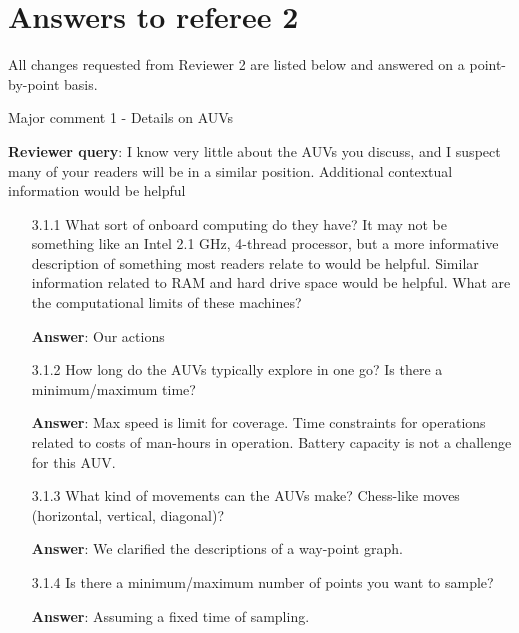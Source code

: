 \documentclass[a4paper]{article}
\newcounter{reviewer}
\def\reply{\textbf{Reviewer query}}
\def\action{\textbf{Answer}}
\begin{document}

\section*{Answers to referee 2}
All changes requested from Reviewer 2 are listed below and answered on a point-by-point basis.

\setcounter{reviewer}{3}

\begin{answers}
\item{Major comment 1 - Details on AUVs}\label{r2c1}

\reply: I know very little about the AUVs you discuss, and I suspect many of your readers will be in a similar position. Additional contextual information would be helpful

\begin{itemize}[noitemsep,topsep=0pt,parsep=0pt,partopsep=0pt]

\item[3.1.1] What sort of onboard computing do they have? It may not be something like an Intel 2.1 GHz, 4-thread processor, but a more informative description of something most readers relate to would be helpful. Similar information related to RAM and hard drive space would be helpful. What are the computational limits of these machines?\par
\action: Our actions
\vspace{1em}

\item[3.1.2] How long do the AUVs typically explore in one go? Is there a minimum/maximum time?\par 
\action: Max speed is limit for coverage. Time constraints for operations related to costs of man-hours in operation. Battery capacity is not a challenge for this AUV. 
\vspace{1em}

\item[3.1.3] What kind of movements can the AUVs make? Chess-like moves (horizontal, vertical, diagonal)?\par  
\action: We clarified the descriptions of a way-point graph.
\vspace{1em}

\item[3.1.4] Is there a minimum/maximum number of points you want to sample?\par
\action: Assuming a fixed time of sampling.
\vspace{1em}


\end{itemize}
\end{answers}
\end{document}
